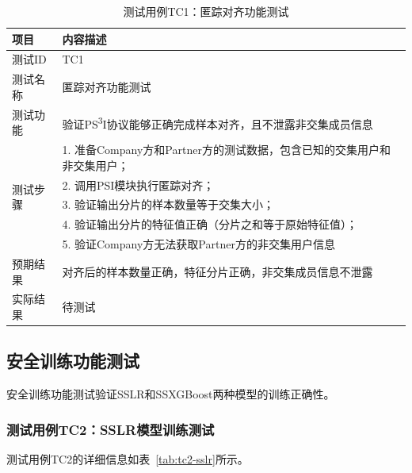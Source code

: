 \begin{table}[htbp]
    \centering
    \caption{测试用例TC1：匿踪对齐功能测试}
    \label{tab:tc1-psi}
    \begin{tabular}{lp{9cm}}
        \toprule
        \textbf{项目} & \textbf{内容描述} \\
        \midrule
        测试ID & TC1 \\
        测试名称 & 匿踪对齐功能测试 \\
        测试功能 & 验证PS\textsuperscript{3}I协议能够正确完成样本对齐，且不泄露非交集成员信息 \\
        \midrule
        \multirow{5}{*}{测试步骤} & 1. 准备Company方和Partner方的测试数据，包含已知的交集用户和非交集用户； \\
        & 2. 调用PSI模块执行匿踪对齐； \\
        & 3. 验证输出分片的样本数量等于交集大小； \\
        & 4. 验证输出分片的特征值正确（分片之和等于原始特征值）； \\
        & 5. 验证Company方无法获取Partner方的非交集用户信息 \\
        \midrule
        预期结果 & 对齐后的样本数量正确，特征分片正确，非交集成员信息不泄露 \\
        实际结果 & 待测试 \\
        \bottomrule
    \end{tabular}
\end{table}

\subsection{安全训练功能测试}

安全训练功能测试验证SSLR和SSXGBoost两种模型的训练正确性。

\subsubsection{测试用例TC2：SSLR模型训练测试}

测试用例TC2的详细信息如表~\ref{tab:tc2-sslr}所示。

